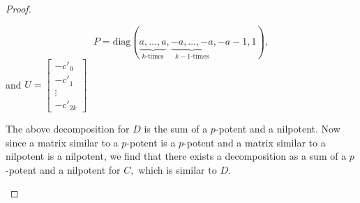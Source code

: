 \documentclass[10pt,a4paper]{amsart}
\newcommand{\diag}{\mathrm{diag}}
\begin{document}
\begin{proof}
\begin{itemize}
$$P=\diag (\underbrace{a,\dots,a }_{k \textrm{-times}} ,\underbrace{-a,\dots,-a }_{k-1 \textrm{-times}} ,-a-1,1),$$ and
$U=\begin{bmatrix}
    -c'_0\\
    -c'_1\\
   \vdots\\
    -c'_{2k}
  \end{bmatrix}$


The above decomposition for $D$ is the sum of a $p$-potent and a nilpotent. Now since a matrix similar to a $p$-potent is a $p$-potent and a matrix similar to a nilpotent is a nilpotent, we find that there exists a decomposition as a sum of a $p$-potent and a nilpotent for $C,$ which is similar to $D$.
\end{itemize}
\end{proof}
\end{document}
